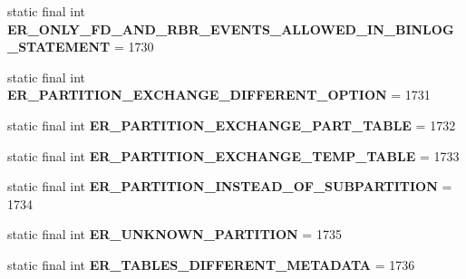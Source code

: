 \begin{DoxyCompactItemize}
static final int {\bfseries E\+R\+\_\+\+O\+N\+L\+Y\+\_\+\+F\+D\+\_\+\+A\+N\+D\+\_\+\+R\+B\+R\+\_\+\+E\+V\+E\+N\+T\+S\+\_\+\+A\+L\+L\+O\+W\+E\+D\+\_\+\+I\+N\+\_\+\+B\+I\+N\+L\+O\+G\+\_\+\+S\+T\+A\+T\+E\+M\+E\+NT} = 1730
\item 
\mbox{\label{classcom_1_1mysql_1_1jdbc_1_1_mysql_error_numbers_afba7bbb96c8f3b5c7cd2dda96a474a87}} 
static final int {\bfseries E\+R\+\_\+\+P\+A\+R\+T\+I\+T\+I\+O\+N\+\_\+\+E\+X\+C\+H\+A\+N\+G\+E\+\_\+\+D\+I\+F\+F\+E\+R\+E\+N\+T\+\_\+\+O\+P\+T\+I\+ON} = 1731
\item 
\mbox{\label{classcom_1_1mysql_1_1jdbc_1_1_mysql_error_numbers_a4ae6bee377cde011141a7c95245da6b0}} 
static final int {\bfseries E\+R\+\_\+\+P\+A\+R\+T\+I\+T\+I\+O\+N\+\_\+\+E\+X\+C\+H\+A\+N\+G\+E\+\_\+\+P\+A\+R\+T\+\_\+\+T\+A\+B\+LE} = 1732
\item 
\mbox{\label{classcom_1_1mysql_1_1jdbc_1_1_mysql_error_numbers_a13eb3421d94849ce7c6942331ca98383}} 
static final int {\bfseries E\+R\+\_\+\+P\+A\+R\+T\+I\+T\+I\+O\+N\+\_\+\+E\+X\+C\+H\+A\+N\+G\+E\+\_\+\+T\+E\+M\+P\+\_\+\+T\+A\+B\+LE} = 1733
\item 
\mbox{\label{classcom_1_1mysql_1_1jdbc_1_1_mysql_error_numbers_af165a60a9082f979adc1e229f370dad5}} 
static final int {\bfseries E\+R\+\_\+\+P\+A\+R\+T\+I\+T\+I\+O\+N\+\_\+\+I\+N\+S\+T\+E\+A\+D\+\_\+\+O\+F\+\_\+\+S\+U\+B\+P\+A\+R\+T\+I\+T\+I\+ON} = 1734
\item 
\mbox{\label{classcom_1_1mysql_1_1jdbc_1_1_mysql_error_numbers_a4cd794af76c6b442cc529d30265b4a7d}} 
static final int {\bfseries E\+R\+\_\+\+U\+N\+K\+N\+O\+W\+N\+\_\+\+P\+A\+R\+T\+I\+T\+I\+ON} = 1735
\item 
\mbox{\label{classcom_1_1mysql_1_1jdbc_1_1_mysql_error_numbers_ae283c7717f94ef03e7b4a149b91109a0}} 
static final int {\bfseries E\+R\+\_\+\+T\+A\+B\+L\+E\+S\+\_\+\+D\+I\+F\+F\+E\+R\+E\+N\+T\+\_\+\+M\+E\+T\+A\+D\+A\+TA} = 1736
\item 
\mbox{\label{classcom_1_1mysql_1_1jdbc_1_1_mysql_error_numbers_a5f994fe27fd9f7cac43f957f2dc21d47}} 

\end{DoxyCompactItemize}
